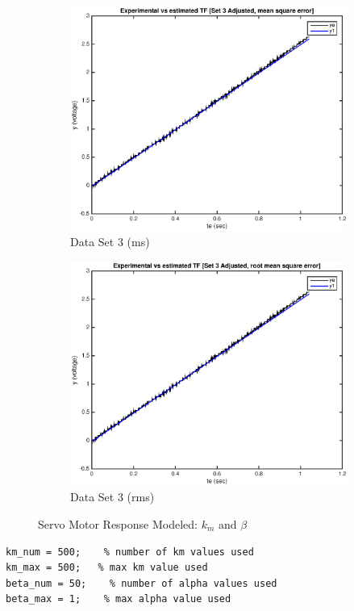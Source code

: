 \documentclass[11pt,a4paper]{article}
\begin{document}
\begin{enumerate}
\begin{figure}[H]
  \begin{subfigure}{0.5\textwidth}
  \includegraphics[width=0.9\linewidth]{Matlab_Figures/y2_dataset3_ms.eps} 
  \caption{Data Set 3 (ms)}
  \label{fig:subim1}
  \end{subfigure}
  \begin{subfigure}{0.5\textwidth}
  \includegraphics[width=0.9\linewidth]{Matlab_Figures/y2_dataset3_rms.eps}
  \caption{Data Set 3 (rms)}
  \label{fig:subim2}
  \end{subfigure}
    \caption{\label{fig:rand}Servo Motor Response Modeled: $k_m$ and $\beta$}
    \end{figure}
    
    \pagebreak
 \begin{lstlisting}
km_num = 500;    % number of km values used
km_max = 500;   % max km value used
beta_num = 50;    % number of alpha values used
beta_max = 1;    % max alpha value used


\end{lstlisting}
\end{enumerate}
\end{document}
